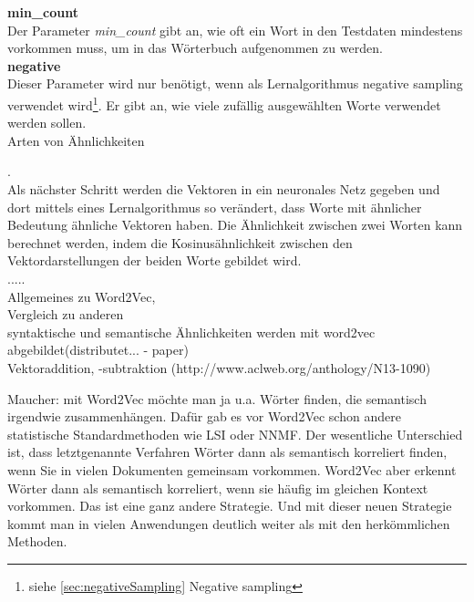 \documentclass[12pt,a4paper]{report}
\begin{document}
	\textbf{min\_count}
	\vspace{1em}\\
	Der Parameter \textit{min\_count} gibt an, wie oft ein Wort in den Testdaten mindestens vorkommen muss, um in das Wörterbuch aufgenommen zu werden.\\
	
	\textbf{negative}
	\vspace{1em}\\
	Dieser Parameter wird nur benötigt, wenn als Lernalgorithmus negative sampling verwendet wird\footnote{siehe \ref{sec:negativeSampling} Negative sampling}. Er gibt an, wie viele zufällig ausgewählten Worte verwendet werden sollen.\\



Arten von Ähnlichkeiten



.\\

Als nächster Schritt werden die Vektoren in ein neuronales Netz gegeben und dort mittels eines Lernalgorithmus so verändert, dass Worte mit ähnlicher Bedeutung ähnliche Vektoren haben. Die Ähnlichkeit zwischen zwei Worten kann berechnet werden, indem die Kosinusähnlichkeit zwischen den Vektordarstellungen der beiden Worte gebildet wird.\\



.....\\
Allgemeines zu Word2Vec,\\
 Vergleich zu anderen\\
  syntaktische und semantische Ähnlichkeiten werden mit word2vec abgebildet(distributet... - paper)\\
  Vektoraddition, -subtraktion (http://www.aclweb.org/anthology/N13-1090)\\
  
\iffalse

Maucher:
mit Word2Vec möchte man ja u.a. Wörter finden, die semantisch irgendwie zusammenhängen. Dafür gab es vor Word2Vec schon andere statistische Standardmethoden wie LSI oder NNMF. Der wesentliche Unterschied ist, dass letztgenannte Verfahren Wörter dann als semantisch korreliert finden, wenn Sie in vielen Dokumenten gemeinsam vorkommen.
 Word2Vec aber erkennt Wörter dann als semantisch korreliert, wenn sie häufig im gleichen Kontext vorkommen. 
 Das ist eine ganz andere Strategie. 
 Und mit dieser neuen Strategie kommt man in vielen Anwendungen deutlich weiter als mit den herkömmlichen Methoden.\\
\end{document}
